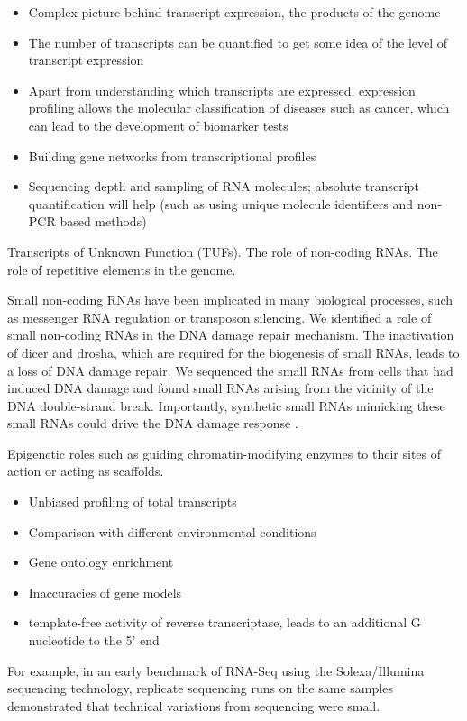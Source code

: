 \begin{itemize}
   \item Complex picture behind transcript expression, the products of the genome
   \item The number of transcripts can be quantified to get some idea of the level of transcript expression
   \item Apart from understanding which transcripts are expressed, expression profiling allows the molecular classification of diseases such as cancer, which can lead to the development of biomarker tests   \item Building gene networks from transcriptional profiles
   \item Sequencing depth and sampling of RNA molecules; absolute transcript quantification will help (such as using unique molecule identifiers and non-PCR based methods)
\end{itemize}

Transcripts of Unknown Function (TUFs). The role of non-coding RNAs. The role of repetitive elements in the genome.

Small non-coding RNAs have been implicated in many biological processes, such as messenger RNA regulation or transposon silencing. We identified a role of small non-coding RNAs in the DNA damage repair mechanism. The inactivation of dicer and drosha, which are required for the biogenesis of small RNAs, leads to a loss of DNA damage repair. We sequenced the small RNAs from cells that had induced DNA damage and found small RNAs arising from the vicinity of the DNA double-strand break. Importantly, synthetic small RNAs mimicking these small RNAs could drive the DNA damage response \cite{francia2012site}.

Epigenetic roles such as guiding chromatin-modifying enzymes to their sites of action or acting as scaffolds.

\begin{itemize}
   \item Unbiased profiling of total transcripts
   \item Comparison with different environmental conditions
   \item Gene ontology enrichment
   \item Inaccuracies of gene models
   \item template-free activity of reverse transcriptase, leads to an additional G nucleotide to the 5' end
\end{itemize}

For example, in an early benchmark of RNA-Seq using the Solexa/Illumina sequencing technology, replicate sequencing runs on the same samples demonstrated that technical variations from sequencing were small\cite{pmid18550803}.

